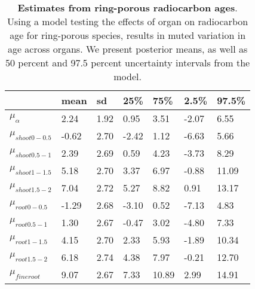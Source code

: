 \documentclass{article}\usepackage[]{graphicx}\usepackage[]{color}
\begin{document}
\begin{table}[ht]
\centering
\caption{\textbf{Estimates from ring-porous radiocarbon ages}. Using a model testing the effects of organ on radiocarbon age for ring-porous species, results in muted variation in age across organs. We present posterior means, as well as 50 percent and 97.5 percent uncertainty intervals from the model.} 
\label{tab:ringradio}
\begingroup\footnotesize
\begin{tabular}{|p{}|p{}|p{}|p{}|p{}|p{}|p{}|}
  \hline
 & mean & sd & 25\% & 75\% & 2.5\% & 97.5\% \\ 
  \hline
$\mu_{\alpha}$ & 2.24 & 1.92 & 0.95 & 3.51 & -2.07 & 6.55 \\ 
  $\mu_{shoot 0-0.5}$ & -0.62 & 2.70 & -2.42 & 1.12 & -6.63 & 5.66 \\ 
  $\mu_{shoot 0.5-1}$ & 2.39 & 2.69 & 0.59 & 4.23 & -3.73 & 8.29 \\ 
  $\mu_{shoot 1-1.5}$ & 5.18 & 2.70 & 3.37 & 6.97 & -0.88 & 11.09 \\ 
  $\mu_{shoot 1.5-2}$ & 7.04 & 2.72 & 5.27 & 8.82 & 0.91 & 13.17 \\ 
  $\mu_{root 0-0.5}$ & -1.29 & 2.68 & -3.10 & 0.52 & -7.13 & 4.83 \\ 
  $\mu_{root 0.5-1}$ & 1.30 & 2.67 & -0.47 & 3.02 & -4.80 & 7.33 \\ 
  $\mu_{root 1-1.5}$ & 4.15 & 2.70 & 2.33 & 5.93 & -1.89 & 10.34 \\ 
  $\mu_{root 1.5-2}$ & 6.18 & 2.74 & 4.38 & 7.97 & -0.21 & 12.70 \\ 
  $\mu_{fineroot}$ & 9.07 & 2.67 & 7.33 & 10.89 & 2.99 & 14.91 \\ 
   \hline
\end{tabular}
\endgroup
\end{table}
\end{document}
